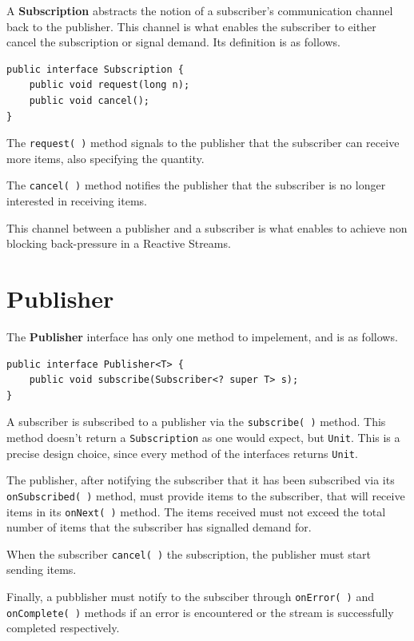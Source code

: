 A \textbf{Subscription} abstracts the notion of a subscriber's
communication channel back to the publisher. This channel is what
enables the subscriber to either cancel the subscription or signal
demand. Its definition is as follows.

\begin{verbatim}
public interface Subscription {
    public void request(long n);
    public void cancel();
}
\end{verbatim}

The \texttt{request(\ )} method signals to the publisher that the
subscriber can receive more items, also specifying the quantity.

The \texttt{cancel(\ )} method notifies the publisher that the
subscriber is no longer interested in receiving items.

This channel between a publisher and a subscriber is what enables to
achieve non blocking back-pressure in a Reactive Streams.

\section{Publisher}\label{publisher}

The \textbf{Publisher} interface has only one method to impelement, and
is as follows.

\begin{verbatim}
public interface Publisher<T> {
    public void subscribe(Subscriber<? super T> s);
}
\end{verbatim}

A subscriber is subscribed to a publisher via the \texttt{subscribe(\ )}
method. This method doesn't return a \texttt{Subscription} as one would
expect, but \texttt{Unit}. This is a precise design choice, since every
method of the interfaces returns \texttt{Unit}.

The publisher, after notifying the subscriber that it has been
subscribed via its \texttt{onSubscribed(\ )} method, must provide items
to the subscriber, that will receive items in its \texttt{onNext(\ )}
method. The items received must not exceed the total number of items
that the subscriber has signalled demand for.

When the subscriber \texttt{cancel(\ )} the subscription, the publisher
must start sending items.

Finally, a pubblisher must notify to the subsciber through
\texttt{onError(\ )} and \texttt{onComplete(\ )} methods if an error is
encountered or the stream is successfully completed respectively.

